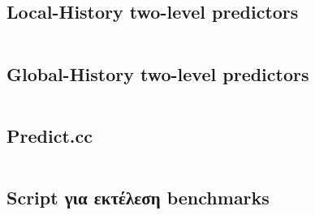 \documentclass[a4paper,10pt]{article}
\begin{document}
\subsection*{Local-History two-level predictors}
\inputminted[linenos,fontsize=\scriptsize,frame=leftline]{cpp}{files/lhistory.h}

\subsection*{Global-History two-level predictors}
\inputminted[linenos,fontsize=\scriptsize,frame=leftline]{cpp}{files/ghistory.h}

\subsection*{Predict.cc}
\inputminted[linenos,fontsize=\scriptsize,frame=leftline]{cpp}{files/predict.cc}

\subsection*{Script για εκτέλεση benchmarks}
\inputminted[linenos,fontsize=\scriptsize,frame=leftline]{bash}{files/run.sh}


\end{document}
